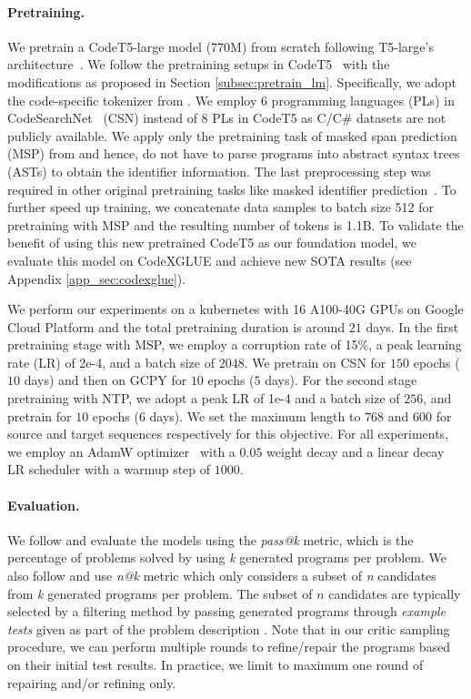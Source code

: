 \documentclass{article}
\begin{document}
\paragraph{Pretraining.} 
We pretrain a CodeT5-large model (770M) from scratch following T5-large's architecture~\citep{t5}. We follow the pretraining setups in CodeT5~\citep{codet5} with the modifications as proposed in Section \ref{subsec:pretrain_lm}.
Specifically, we adopt the code-specific tokenizer from \citet{codet5}.
We employ 6 programming languages (PLs) in CodeSearchNet~\citep{csn} (CSN) instead of 8 PLs in CodeT5 as C/C\# datasets are not publicly available. 
We apply only the pretraining task of masked span prediction (MSP) from \citep{codet5} and hence, do not have to parse programs into abstract syntax trees (ASTs) to obtain the identifier information.
The last preprocessing step was required in other original pretraining tasks like masked identifier prediction~\citep{codet5}.
To further speed up training, we concatenate data samples to batch size 512 for pretraining with MSP and the resulting number of tokens is 1.1B.
To validate the benefit of using this new pretrained CodeT5 as our foundation model, we evaluate this model on CodeXGLUE \citep{codexglue} and achieve new SOTA results (see Appendix \ref{app_sec:codexglue}). 

We perform our experiments on a kubernetes with 16 A100-40G GPUs on Google Cloud Platform and the total pretraining duration is around $21$ days.
In the first pretraining stage with MSP, we employ a corruption rate of 15\%, a peak learning rate (LR) of 2e-4, and a batch size of $2048$. We pretrain on CSN for $150$ epochs ($10$ days) and then on GCPY for $10$ epochs ($5$ days). 
For the second stage pretraining with NTP, we adopt a peak LR of 1e-4 and a batch size of $256$, and pretrain for $10$ epochs (6 days). We set the maximum length to $768$ and $600$ for source and target sequences respectively for this objective.
For all  experiments, we employ an AdamW optimizer~\citep{DBLP:conf/iclr/LoshchilovH19} with a $0.05$ weight decay and a linear decay LR scheduler with a warmup step of $1000$. 

\paragraph{Evaluation.} 
We follow \citep{hendrycksapps2021, chen2021evaluating} and evaluate the models using the \emph{pass@k} metric, which is the percentage of problems solved by using \emph{k} generated programs per problem.  
We also follow \citep{li2022competition} and use \emph{n@k} metric which only considers a subset of \emph{n} candidates from \emph{k} generated programs per problem. 
The subset of $n$ candidates are typically selected by a filtering method by passing generated programs through \emph{example tests} given as part of the problem description \citep{chen2021evaluating, li2022competition}. 
Note that in our critic sampling procedure, we can perform multiple rounds to refine/repair the programs based on their initial test results. 
In practice, we limit to maximum one round of repairing and/or refining only. 
\end{document}
